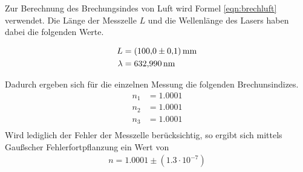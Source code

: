 Zur Berechnung des Brechungsindes von Luft wird Formel \ref{eqn:brechluft}
verwendet. Die Länge der Messzelle $L$ und die Wellenlänge des Lasers
haben dabei die folgenden Werte.

\begin{align*}
  L &= \SI{100 \pm 0.1}{\milli\meter} \\
  \lambda &= \SI{632.990}{\nano\meter} \\
\end{align*}

Dadurch ergeben sich für die einzelnen Messung die folgenden Brechunsindizes.
\begin{align*}
  n_1 &= 1.0001 \\
  n_2 &= 1.0001 \\
  n_3 &= 1.0001 \\
\end{align*}
Wird lediglich der Fehler der Messzelle berücksichtig, so ergibt sich mittels
Gaußscher Fehlerfortpflanzung ein Wert von
\begin{align*}
  n = 1.0001 \pm (1.3 \cdot 10^{-7}) \\
\end{align*}
